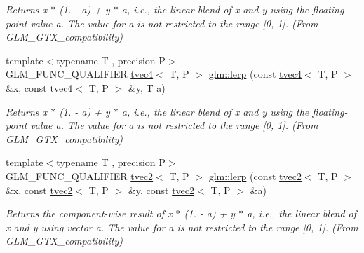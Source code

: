 \begin{DoxyCompactItemize}
\begin{DoxyCompactList}\small\item\em Returns x $\ast$ (1. -\/ a) + y $\ast$ a, i.\+e., the linear blend of x and y using the floating-\/point value a. The value for a is not restricted to the range \mbox{[}0, 1\mbox{]}. (From G\+L\+M\+\_\+\+G\+T\+X\+\_\+compatibility) \end{DoxyCompactList}\item 
\mbox{\label{group__gtx__compatibility_ga363d5d069d31a6c2cdd1e9589dde4a60}} 
{\footnotesize template$<$typename T , precision P$>$ }\\G\+L\+M\+\_\+\+F\+U\+N\+C\+\_\+\+Q\+U\+A\+L\+I\+F\+I\+ER \hyperlink{structglm_1_1tvec4}{tvec4}$<$ T, P $>$ \hyperlink{group__gtx__compatibility_ga363d5d069d31a6c2cdd1e9589dde4a60}{glm\+::lerp} (const \hyperlink{structglm_1_1tvec4}{tvec4}$<$ T, P $>$ \&x, const \hyperlink{structglm_1_1tvec4}{tvec4}$<$ T, P $>$ \&y, T a)
\begin{DoxyCompactList}\small\item\em Returns x $\ast$ (1. -\/ a) + y $\ast$ a, i.\+e., the linear blend of x and y using the floating-\/point value a. The value for a is not restricted to the range \mbox{[}0, 1\mbox{]}. (From G\+L\+M\+\_\+\+G\+T\+X\+\_\+compatibility) \end{DoxyCompactList}\item 
\mbox{\label{group__gtx__compatibility_ga7609b44d8aefc5a277efe73395ff4070}} 
{\footnotesize template$<$typename T , precision P$>$ }\\G\+L\+M\+\_\+\+F\+U\+N\+C\+\_\+\+Q\+U\+A\+L\+I\+F\+I\+ER \hyperlink{structglm_1_1tvec2}{tvec2}$<$ T, P $>$ \hyperlink{group__gtx__compatibility_ga7609b44d8aefc5a277efe73395ff4070}{glm\+::lerp} (const \hyperlink{structglm_1_1tvec2}{tvec2}$<$ T, P $>$ \&x, const \hyperlink{structglm_1_1tvec2}{tvec2}$<$ T, P $>$ \&y, const \hyperlink{structglm_1_1tvec2}{tvec2}$<$ T, P $>$ \&a)
\begin{DoxyCompactList}\small\item\em Returns the component-\/wise result of x $\ast$ (1. -\/ a) + y $\ast$ a, i.\+e., the linear blend of x and y using vector a. The value for a is not restricted to the range \mbox{[}0, 1\mbox{]}. (From G\+L\+M\+\_\+\+G\+T\+X\+\_\+compatibility) \end{DoxyCompactList}\item 
\mbox{\label{group__gtx__compatibility_ga90a1d1364a8d078846857178bdcc9af1}} 

\end{DoxyCompactItemize}
